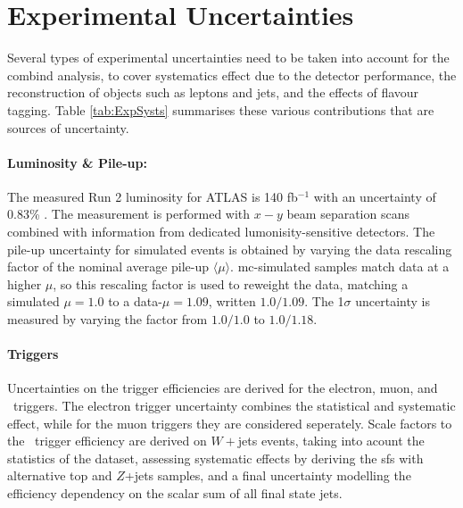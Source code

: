 \section{Experimental Uncertainties}\label{sec-unc} %
Several types of experimental uncertainties need to be taken into account for the combind analysis, to cover systematics effect due to the detector performance, the reconstruction of objects such as leptons and jets, and the effects of flavour tagging. Table \ref{tab:ExpSysts} summarises these various contributions that are sources of uncertainty.


\paragraph{Luminosity \& Pile-up:} The measured Run 2 luminosity for ATLAS is 140 fb$^{-1}$ with an uncertainty of 0.83\% \cite{ATLAS:2022hro}. The measurement is performed with $x-y$ beam separation scans combined with information from dedicated lumonisity-sensitive detectors. The pile-up uncertainty for simulated events is obtained by varying the data rescaling factor of the nominal average pile-up $\langle \mu \rangle$. \gls{mc}-simulated samples match data at a higher $\mu$, so this rescaling factor is used to reweight the data, matching a simulated $\mu = 1.0$ to a data-$\mu = 1.09$, written $1.0/1.09$. The 1$\sigma$ uncertainty is measured by varying the factor from $1.0/1.0$ to $1.0/1.18$. %

\paragraph{Triggers} Uncertainties on the trigger efficiencies are derived for the electron, muon, and \etm\ triggers. The electron trigger uncertainty combines the statistical and systematic effect, while for the muon triggers they are considered seperately. Scale factors to the \etm\ trigger efficiency are derived on $W+$jets events, taking into acount the statistics of the dataset, assessing systematic effects by deriving the \gls{sf}s with alternative top and $Z$+jets samples, and a final uncertainty modelling the efficiency dependency on the scalar sum of all final state jets. %

